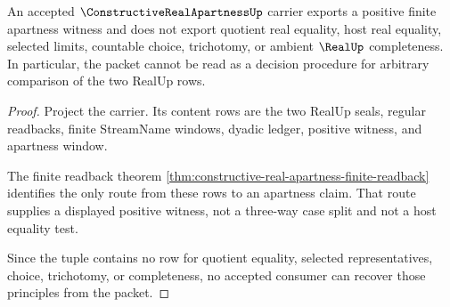 \begin{theorem}
\label{thm:constructive-real-apartness-nontrichotomy-boundary}
An accepted $\ConstructiveRealApartnessUp$ carrier exports a positive finite apartness witness and does not export quotient real equality, host real equality, selected limits, countable choice, trichotomy, or ambient $\RealUp$ completeness. In particular, the packet cannot be read as a decision procedure for arbitrary comparison of the two RealUp rows.
\end{theorem}
\begin{proof}
Project the carrier. Its content rows are the two RealUp seals, regular readbacks, finite StreamName windows, dyadic ledger, positive witness, and apartness window.

The finite readback theorem \autoref{thm:constructive-real-apartness-finite-readback} identifies the only route from these rows to an apartness claim. That route supplies a displayed positive witness, not a three-way case split and not a host equality test.

Since the tuple contains no row for quotient equality, selected representatives, choice, trichotomy, or completeness, no accepted consumer can recover those principles from the packet.
\end{proof}



